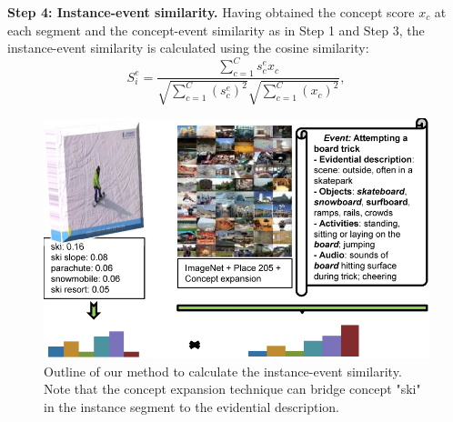\textbf{Step 4: Instance-event similarity.} Having obtained the concept score $x_{c}$ at each segment and the concept-event similarity as in Step 1 and Step 3, the instance-event similarity is calculated using the cosine similarity:
\begin{equation}
\label{eq1}
S_{i}^{e}=\frac{\sum_{c=1}^{C}s_{c}^{e}x_{c}}{\sqrt{\sum_{c=1}^{C}(s_{c}^{e})^{2}}\sqrt{\sum_{c=1}^{C}(x_{c})^{2}}},
\end{equation}
\begin{figure}
	\centering
	\includegraphics[width=1\textwidth]{figure_2.pdf}
	\caption{Outline of our method to calculate the instance-event similarity. Note that the concept expansion technique can bridge concept "ski" in the instance segment to the evidential description.}
	\label{figure_2}
\end{figure}


